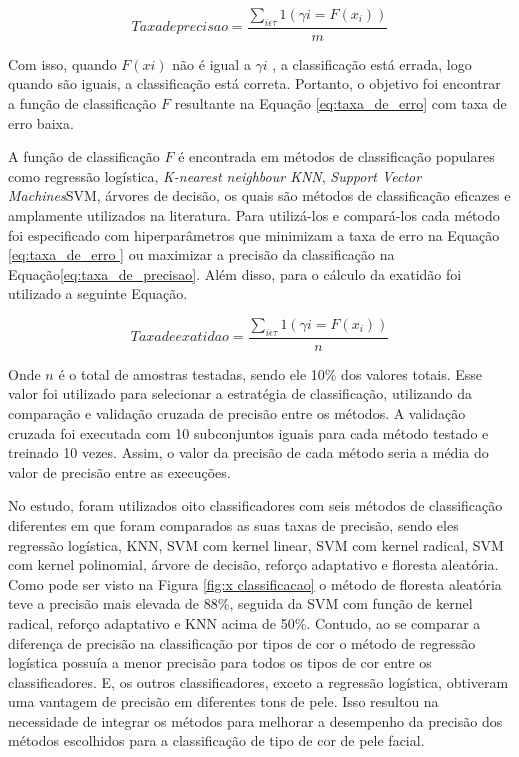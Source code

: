 \begin{equation}
\label{eq:taxa_de_precisao}
Taxa de precisao = \dfrac{\sum _{i\epsilon \tau} 1(\gamma i =  F(x_{i}))}{m}
\end{equation}

Com isso, quando $F (xi)$ não é igual a $\gamma i$ , a classificação está errada, logo quando são iguais, a classificação está correta. Portanto, o objetivo foi encontrar a função de classificação $F$ resultante na Equação \ref{eq:taxa_de_erro}  com taxa de erro baixa.

A função de classificação $F$ é encontrada em métodos de classificação populares como regressão logística,\textit{ K-nearest neighbour \gls{KNN}}, \textit{Support Vector Machines}\gls{SVM}, árvores de decisão, os quais são métodos de classificação eficazes e amplamente utilizados na literatura. Para utilizá-los e compará-los cada método foi especificado com hiperparâmetros que minimizam a taxa de erro na Equação \ref{eq:taxa_de_erro } ou maximizar a precisão da classificação na Equação\ref{eq:taxa_de_precisao}. 
Além disso, para o cálculo da exatidão foi utilizado a seguinte Equação.

\begin{equation}
\label{eq:taxa_de_exatidao}
Taxa de exatidao = \dfrac{\sum _{i\epsilon \tau} 1(\gamma i =  F(x_{i}))}{n}
\end{equation}

Onde $n$ é o total de amostras testadas, sendo ele 10\% dos valores totais. Esse valor foi utilizado para selecionar a estratégia de classificação, utilizando da comparação e validação cruzada de precisão entre os métodos.  A validação cruzada foi executada com 10 subconjuntos iguais para cada método testado e treinado 10 vezes. Assim, o valor da precisão de cada método seria a média do valor de precisão entre as execuções. 

No estudo, foram utilizados oito classificadores com seis métodos de classificação diferentes em que foram comparados as suas taxas de precisão, sendo eles regressão logística, KNN, SVM com kernel linear, SVM com kernel radical, SVM com kernel polinomial, árvore de decisão, reforço adaptativo e floresta aleatória. Como pode ser visto na Figura \ref{fig:x classificacao} o método de floresta aleatória teve a precisão mais elevada de 88\%, seguida da SVM com função de kernel radical, reforço adaptativo e KNN acima de 50\%. Contudo, ao se comparar a diferença de precisão na classificação por tipos de cor o método de regressão logística possuía a menor precisão para todos os tipos de cor entre os classificadores. E, os outros classificadores, exceto a regressão logística, obtiveram uma vantagem de precisão em diferentes tons de pele. Isso resultou na necessidade de integrar os métodos para melhorar a desempenho da precisão dos métodos escolhidos para a classificação de tipo de cor de pele facial.

